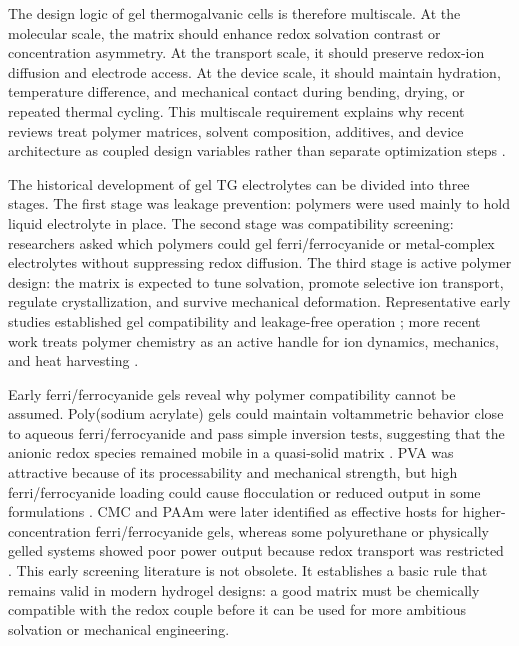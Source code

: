 The design logic of gel thermogalvanic cells is therefore multiscale. At the
molecular scale, the matrix should enhance redox solvation contrast or
concentration asymmetry. At the transport scale, it should preserve redox-ion
diffusion and electrode access. At the device scale, it should maintain
hydration, temperature difference, and mechanical contact during bending,
drying, or repeated thermal cycling. This multiscale requirement explains why
recent reviews treat polymer matrices, solvent composition, additives, and
device architecture as coupled design variables rather than separate
optimization steps \citep{kim2026functional,shang2026pushing,xu2026birdseye}.

The historical development of gel TG electrolytes can be divided into three
stages. The first stage was leakage prevention: polymers were used mainly to
hold liquid electrolyte in place. The second stage was compatibility screening:
researchers asked which polymers could gel ferri/ferrocyanide or metal-complex
electrolytes without suppressing redox diffusion. The third stage is active
polymer design: the matrix is expected to tune solvation, promote selective ion
transport, regulate crystallization, and survive mechanical deformation.
Representative early studies established gel compatibility and leakage-free
operation \citep{wu2017gelled,jin2016quasisolid,russo2019hydrogels}; more recent
work treats polymer chemistry as an active handle for ion dynamics, mechanics,
and heat harvesting \citep{lin2024triple,lu2024zwitterion,liu2024subzero}.

Early ferri/ferrocyanide gels reveal why polymer compatibility cannot be
assumed. Poly(sodium acrylate) gels could maintain voltammetric behavior close
to aqueous ferri/ferrocyanide and pass simple inversion tests, suggesting that
the anionic redox species remained mobile in a quasi-solid matrix
\citep{wu2017gelled}. PVA was attractive because of its processability and
mechanical strength, but high ferri/ferrocyanide loading could cause
flocculation or reduced output in some formulations \citep{russo2019hydrogels}.
CMC and PAAm were later identified as effective hosts for higher-concentration
ferri/ferrocyanide gels, whereas some polyurethane or physically gelled systems
showed poor power output because redox transport was restricted
\citep{russo2019hydrogels}. This early screening literature is not obsolete. It
establishes a basic rule that remains valid in modern hydrogel designs: a good
matrix must be chemically compatible with the redox couple before it can be
used for more ambitious solvation or mechanical engineering.


